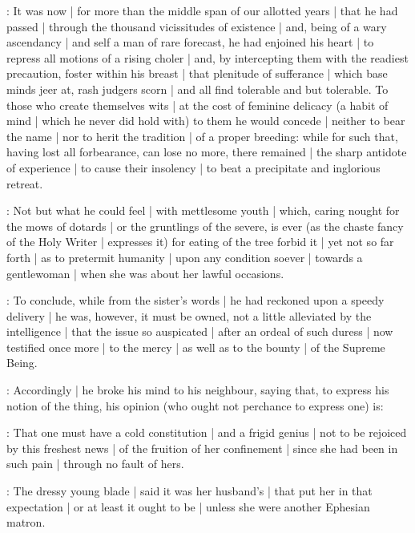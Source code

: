 \begin{omitted}

:
It was now |
for more than the middle span of our allotted years |
that he had passed |
through the thousand vicissitudes of existence |
and,
being of a wary ascendancy |
and self a man of rare forecast,
he had enjoined his heart |
to repress all motions of a rising choler |
and,
by intercepting them with the readiest precaution,
foster within his breast |
that plenitude of sufferance |
which base minds jeer at,
rash judgers scorn |
and all find tolerable and but tolerable.
To those who create themselves wits |
at the cost of feminine delicacy
(a habit of mind |
which he never did hold with)
to them he would concede |
neither to bear the name |
nor to herit the tradition |
of a proper breeding:
while for such that,
having lost all forbearance,
can lose no more,
there remained |
the sharp antidote of experience |
to cause their insolency |
to beat a precipitate and inglorious retreat.

:
Not but what he could feel |
with mettlesome youth |
which,
caring nought for the mows of dotards |
or the gruntlings of the severe,
is ever
(as the chaste fancy of the Holy Writer |
expresses it)
for eating of the tree forbid it |
yet not so far forth |
as to pretermit humanity |
upon any condition soever |
towards a gentlewoman |
when she was about her lawful occasions.

:
To conclude,
while from the sister's words |
he had reckoned upon a speedy delivery |
he was,
however,
it must be owned,
not a little alleviated by the intelligence |
that the issue so auspicated |
after an ordeal of such duress |
now testified once more |
to the mercy |
as well as to the bounty |
of the Supreme Being.
\end{omitted}



:
Accordingly |
he broke his mind to his neighbour,
saying that,
to express his notion of the thing,
his opinion
(who ought not perchance to express one)
is:

\Bloom:
That one must have a cold constitution |
and a frigid genius |
not to be rejoiced by this freshest news |
of the fruition of her confinement |
since she had been in such pain |
through no fault of hers.

:
The dressy young blade |
said it was her husband's |
that put her in that expectation |
or at least it ought to be |
unless she were another Ephesian matron.

